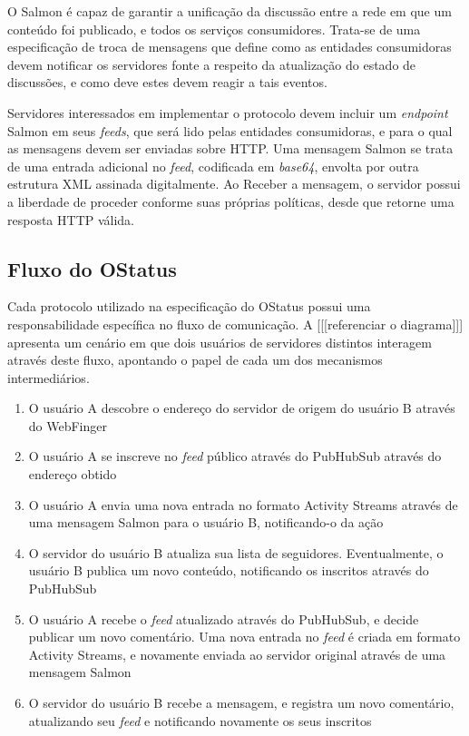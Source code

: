 O Salmon é capaz de garantir a unificação da discussão entre a rede em que um
conteúdo foi publicado, e todos os serviços consumidores. Trata-se de uma 
especificação de troca de mensagens que define como as entidades consumidoras devem 
notificar os servidores fonte a respeito da atualização do estado de discussões, e 
como deve estes devem reagir a tais eventos.

Servidores interessados em implementar o protocolo devem incluir um 
\textit{endpoint} Salmon em seus \textit{feeds}, que será lido pelas entidades
consumidoras, e para o qual as mensagens devem ser enviadas sobre HTTP. Uma mensagem
Salmon se trata de uma entrada adicional no \textit{feed}, codificada em 
\textit{base64}, envolta por outra estrutura XML assinada digitalmente. Ao Receber a
mensagem, o servidor possui a liberdade de proceder conforme suas próprias 
políticas, desde que retorne uma resposta HTTP válida.

\subsection{Fluxo do OStatus}

Cada protocolo utilizado na especificação do OStatus possui uma responsabilidade
específica no fluxo de comunicação. A [[[referenciar o diagrama]]] apresenta um
cenário em que dois usuários de servidores distintos interagem através deste fluxo,
apontando o papel de cada um dos mecanismos intermediários.


\begin{enumerate}
  \item{O usuário A descobre o endereço do servidor de origem do usuário B através
        do WebFinger}
  \item{O usuário A se inscreve no \textit{feed} público através do PubHubSub
        através do endereço obtido}
  \item{O usuário A envia uma nova entrada no formato Activity Streams através
        de uma mensagem Salmon para o usuário B, notificando-o da ação}
  \item{O servidor do usuário B atualiza sua lista de seguidores. Eventualmente, o
        usuário B publica um novo conteúdo, notificando os inscritos através do
        PubHubSub}
  \item{O usuário A recebe o \textit{feed} atualizado através do PubHubSub, e decide
        publicar um novo comentário. Uma nova entrada no \textit{feed} é criada em
        formato Activity Streams, e novamente enviada ao servidor original através
        de uma mensagem Salmon}
  \item{O servidor do usuário B recebe a mensagem, e registra um novo comentário,
        atualizando seu \textit{feed} e notificando novamente os seus inscritos}
\end{enumerate}


